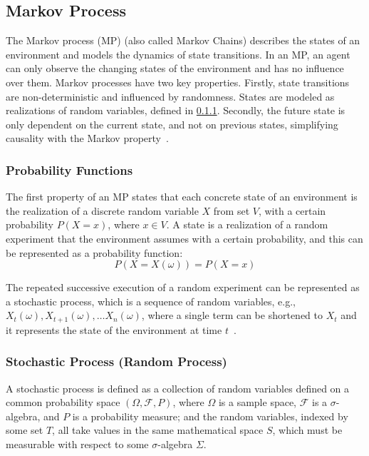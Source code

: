 \documentclass[../xlapes02]{subfiles}
\begin{document}
    \subsection{Markov Process}\label{subsec:markov-process}
    The Markov process (MP) (also called Markov Chains) describes the states of an environment and models the dynamics of state transitions. In an MP, an agent can only observe the changing states of the environment and has no influence over them. Markov processes have two key properties. Firstly, state transitions are non-deterministic and influenced by randomness. States are modeled as realizations of random variables, defined in \cref{subsubsec:probability-functions}. Secondly, the future state is only dependent on the current state, and not on previous states, simplifying causality with the Markov property~\cite{FITMT25127}.

    \subsubsection{Probability Functions}\label{subsubsec:probability-functions}

    The first property of an MP states that each concrete state of an environment is the realization of a discrete random variable \(X\) from set \(V\), with a certain probability \(P(X=x)\), where \(x \in V\). A state is a realization of a random experiment that the environment assumes with a certain probability, and this can be represented as a probability function:
    \begin{equation}
        P(X = X(\omega)) = P(X = x)
    \end{equation}

    The repeated successive execution of a random experiment can be represented as a stochastic process, which is a sequence of random variables, e.g., \(X_t(\omega), X_{t+1}(\omega), \ldots X_n(\omega)\), where a single term can be shortened to \(X_t\) and it represents the state of the environment at time \(t\)~\cite{FITMT25127, rao2022foundations}.

    \subsubsection{Stochastic Process (Random Process)}\label{subsubsec:stochastic-process}
    A stochastic process is defined as a collection of random variables defined on a common probability space $(\Omega, \mathcal{F}, P)$, where $\Omega$ is a sample space, $\mathcal{F}$ is a $\sigma$-algebra, and $P$ is a probability measure; and the random variables, indexed by some set $T$, all take values in the same mathematical space $S$, which must be measurable with respect to some $\sigma$-algebra $\Sigma$.
\end{document}
